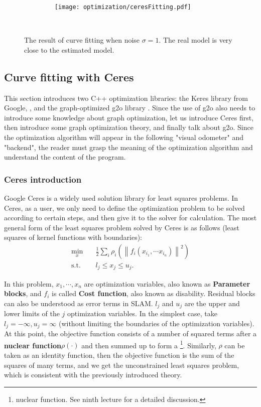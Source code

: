 \begin{figure}[!ht]
    \centering
    \texttt{[image: optimization/ceresFitting.pdf]}
    \caption{The result of curve fitting when noise $\sigma=1$. The real model is very close to the estimated model. }
    \label{fig:ceres-fitting}
\end{figure}

\subsection{Curve fitting with Ceres}
This section introduces two C++ optimization libraries: the Keres library from Google, \textsuperscript{\cite{Ceres}}, and the graph-optimized g2o library \textsuperscript{\cite{Kummerle2011}}. Since the use of g2o also needs to introduce some knowledge about graph optimization, let us introduce Ceres first, then introduce some graph optimization theory, and finally talk about g2o. Since the optimization algorithm will appear in the following "visual odometer" and "backend", the reader must grasp the meaning of the optimization algorithm and understand the content of the program.

\subsubsection{Ceres introduction}
Google Ceres is a widely used solution library for least squares problems. In Ceres, as a user, we only need to define the optimization problem to be solved according to certain steps, and then give it to the solver for calculation. The most general form of the least squares problem solved by Ceres is as follows (least squares of kernel functions with boundaries):
\begin{equation}
\begin{array}{ll}
\min \limits_x \quad & \frac{1}{2}\sum\limits_i {{\rho _i}\left( {{{\left\| {{f_i}\left( {{x_{{i_1}} }, \cdots {x_{{i_n}}}} \right)} \right\|}^2}} \right)} \\
\mathrm{s.t.} \quad & {l_j} \leqslant {x_j} \leqslant {u_j}.
\end{array}
\end{equation}

In this problem, $x_1, \cdots, x_n$ are optimization variables, also known as \textbf{Parameter blocks}, and $f_i$ is called \textbf{Cost function}, also known as disability. Residual blocks can also be understood as error terms in SLAM. $l_j$ and $u_j$ are the upper and lower limits of the $j$ optimization variables. In the simplest case, take $l_j = -\infty, u_j=\infty$ (without limiting the boundaries of the optimization variables). At this point, the objective function consists of a number of squared terms after a \textbf{nuclear function}$\rho(\cdot)$ and then summed up to form a \footnote{nuclear function. See ninth lecture for a detailed discussion. }. Similarly, $\rho$ can be taken as an identity function, then the objective function is the sum of the squares of many terms, and we get the unconstrained least squares problem, which is consistent with the previously introduced theory.

